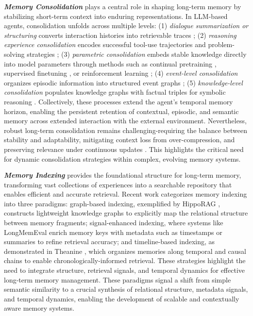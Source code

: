 \documentclass[manuscript,screen]{acmart}
\begin{document}
\textit{\textbf{Memory Consolidation}} plays a central role in shaping long-term memory by stabilizing short-term context into enduring representations. In LLM-based agents, consolidation unfolds across multiple levels: (1) \textit{dialogue summarization or structuring} converts interaction histories into retrievable traces \citep{zhong2024memorybank, wang-etal-summarizing-dialogue-memory-2025, lu2023memochat, hou2024myagent}; (2) \textit{reasoning experience consolidation} encodes successful tool-use trajectories and problem-solving strategies \citep{ouyang2025reasoningbank, fang2025memp}; (3) \textit{parametric consolidation} embeds stable knowledge directly into model parameters through methods such as continual pretraining \citep{jiang2024long}, supervised finetuning \citep{chu2025sft}, or reinforcement learning \citep{wang2025mem, yan2025memory}; (4) \textit{event-level consolidation} organizes episodic information into structured event graphs \citep{zhao2025eventweave}; (5) \textit{knowledge-level consolidation} populates knowledge graphs with factual triples for symbolic reasoning \citep{rasmussen2025zep}. Collectively, these processes extend the agent's temporal memory horizon, enabling the persistent retention of contextual, episodic, and semantic memory across extended interaction with the external environment. Nevertheless, robust long-term consolidation remains challenging-requiring the balance between stability and adaptability, mitigating context loss from over-compression, and preserving relevance under continuous updates \citep{zhang2025agentic}. This highlights the critical need for dynamic consolidation strategies within complex, evolving memory systems.

\textit{\textbf{Memory Indexing}} provides the foundational structure for long-term memory, transforming vast collections of experiences into a searchable repository that enables efficient and accurate retrieval. Recent work categorizes memory indexing into three paradigms: graph-based indexing, exemplified by HippoRAG \citep{gutierrez2024hipporag}, constructs lightweight knowledge graphs to explicitly map the relational structure between memory fragments; signal-enhanced indexing, where systems like LongMemEval \citep{wu2024longmemeval} enrich memory keys with metadata such as timestamps or summaries to refine retrieval accuracy; and timeline-based indexing, as demonstrated in Theanine \citep{ong2025towards}, which organizes memories along temporal and causal chains to enable chronologically-informed retrieval. These strategies highlight the need to integrate structure, retrieval signals, and temporal dynamics for effective long-term memory management. These paradigms signal a shift from simple semantic similarity to a crucial synthesis of relational structure, metadata signals, and temporal dynamics, enabling the development of scalable and contextually aware memory systems.
\end{document}
